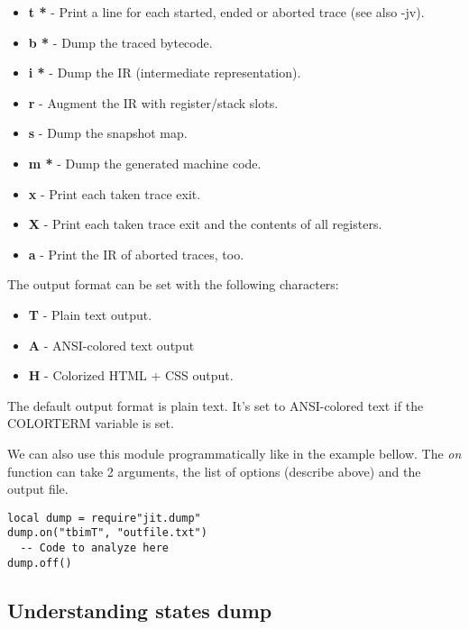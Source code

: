 \begin{itemize}
  \item \textbf{t *} - Print a line for each started, ended or aborted trace (see also -jv).
  \item \textbf{b *} - Dump the traced bytecode.
  \item \textbf{i *} - Dump the IR (intermediate representation).
  \item \textbf{r} - Augment the IR with register/stack slots.
  \item \textbf{s} - Dump the snapshot map.
  \item \textbf{m *} - Dump the generated machine code.
  \item \textbf{x} - Print each taken trace exit.
  \item \textbf{X} - Print each taken trace exit and the contents of all registers.
  \item \textbf{a} - Print the IR of aborted traces, too.
\end{itemize}
The output format can be set with the following characters:
\begin{itemize}
   \item \textbf{T} - Plain text output.
   \item \textbf{A} - ANSI-colored text output
   \item \textbf{H} - Colorized HTML + CSS output.
\end{itemize}
The default output format is plain text. It's set to ANSI-colored text
if the COLORTERM variable is set.

We can also use this module programmatically like in the example bellow. The
\emph{on} function can take 2 arguments, the list of options (describe above)
and the output file.
\begin{lstlisting}[style=LuaStyle]
local dump = require"jit.dump"
dump.on("tbimT", "outfile.txt")
  -- Code to analyze here
dump.off()
\end{lstlisting}


\subsection{Understanding states dump}
\label{Subsec:dump-states}

